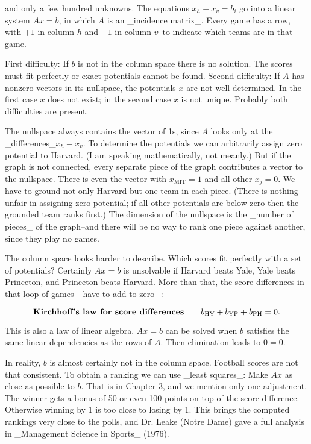 and only a few hundred unknowns. The equations \(x_{h}-x_{v}=b_{i}\) go into a linear system \(Ax=b\), in which \(A\) is an _incidence matrix_. Every game has a row, with \(+1\) in column \(h\) and \(-1\) in column \(v\)--to indicate which teams are in that game.

First difficulty: If \(b\) is not in the column space there is no solution. The scores must fit perfectly or exact potentials cannot be found. Second difficulty: If \(A\) has nonzero vectors in its nullspace, the potentials \(x\) are not well determined. In the first case \(x\) does not exist; in the second case \(x\) is not unique. Probably both difficulties are present.

The nullspace always contains the vector of 1s, since \(A\) looks only at the _differences_\(x_{h}-x_{v}\). To determine the potentials we can arbitrarily assign zero potential to Harvard. (I am speaking mathematically, not meanly.) But if the graph is not connected, every separate piece of the graph contributes a vector to the nullspace. There is even the vector with \(x_{\mathrm{MIT}}=1\) and all other \(x_{j}=0\). We have to ground not only Harvard but one team in each piece. (There is nothing unfair in assigning zero potential; if all other potentials are below zero then the grounded team ranks first.) The dimension of the nullspace is the _number of pieces_ of the graph--and there will be no way to rank one piece against another, since they play no games.

The column space looks harder to describe. Which scores fit perfectly with a set of potentials? Certainly \(Ax=b\) is unsolvable if Harvard beats Yale, Yale beats Princeton, and Princeton beats Harvard. More than that, the score differences in that loop of games _have to add to zero_:

\[\text{\bf Kirchhoff's law for score differences}\qquad b_{\mathrm{HY}}+b_{\mathrm{YP}}+b_{ \mathrm{PH}}=0.\]

This is also a law of linear algebra. \(Ax=b\) can be solved when \(b\) satisfies the same linear dependencies as the rows of \(A\). Then elimination leads to \(0=0\).

In reality, \(b\) is almost certainly not in the column space. Football scores are not that consistent. To obtain a ranking we can use _least squares_: Make \(Ax\) as close as possible to \(b\). That is in Chapter 3, and we mention only one adjustment. The winner gets a bonus of 50 or even 100 points on top of the score difference. Otherwise winning by 1 is too close to losing by 1. This brings the computed rankings very close to the polls, and Dr. Leake (Notre Dame) gave a full analysis in _Management Science in Sports_ (1976).


